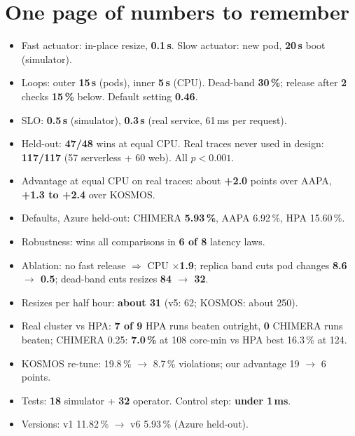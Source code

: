 \documentclass[11pt,a4paper]{article}
\begin{document}
\section{One page of numbers to remember}
\begin{viva}
\begin{itemize}
\item Fast actuator: in-place resize, \textbf{0.1\,s}. Slow actuator: new pod, \textbf{20\,s}
boot (simulator).
\item Loops: outer \textbf{15\,s} (pods), inner \textbf{5\,s} (CPU). Dead-band
\textbf{30\,\%}; release after \textbf{2} checks \textbf{15\,\%} below. Default setting
\textbf{0.46}.
\item SLO: \textbf{0.5\,s} (simulator), \textbf{0.3\,s} (real service, 61\,ms per request).
\item Held-out: \textbf{47/48} wins at equal CPU. Real traces never used in design:
\textbf{117/117} (57 serverless + 60 web). All $p<0.001$.
\item Advantage at equal CPU on real traces: about \textbf{+2.0} points over AAPA,
\textbf{+1.3 to +2.4} over KOSMOS.
\item Defaults, Azure held-out: CHIMERA \textbf{5.93\,\%}, AAPA 6.92\,\%, HPA 15.60\,\%.
\item Robustness: wins all comparisons in \textbf{6 of 8} latency laws.
\item Ablation: no fast release $\Rightarrow$ CPU \textbf{$\times$1.9}; replica band cuts pod
changes \textbf{8.6 $\to$ 0.5}; dead-band cuts resizes \textbf{84 $\to$ 32}.
\item Resizes per half hour: \textbf{about 31} (v5: 62; KOSMOS: about 250).
\item Real cluster vs HPA: \textbf{7 of 9} HPA runs beaten outright, \textbf{0} CHIMERA
runs beaten; CHIMERA 0.25: \textbf{7.0\,\%} at 108 core-min vs HPA best 16.3\,\% at 124.
\item KOSMOS re-tune: 19.8\,\% $\to$ 8.7\,\% violations; our advantage 19 $\to$ 6 points.
\item Tests: \textbf{18} simulator + \textbf{32} operator. Control step: \textbf{under 1\,ms}.
\item Versions: v1 11.82\,\% $\to$ v6 5.93\,\% (Azure held-out).
\end{itemize}
\end{viva}
\end{document}
